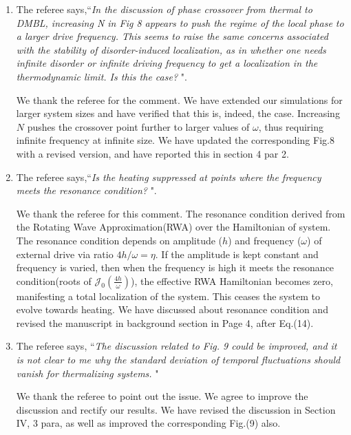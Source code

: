 \documentclass[aps,prb,reprint,showpacs,floatfix,superscriptaddress, onecolumn, nofootinbib, 9pt]{revtex4-2}
\newcommand{\response}[1]{{\color{blue}#1}} %
\begin{document}
\begin{enumerate}
		\item The referee says,``\textit{In the discussion of phase crossover from thermal to DMBL, increasing N in Fig 8 appears to push the regime of the local phase to a larger drive frequency. This seems to raise the same concerns associated with the stability of disorder-induced localization, as in whether one needs infinite disorder or infinite driving frequency to
			get a localization in the thermodynamic limit. Is this the case? }".
		
		\response{    	
			We thank the referee for the comment. We have extended our simulations for larger system sizes and have verified that this is, indeed, the case. Increasing $N$ pushes the crossover point further to larger values of $\omega$, thus requiring infinite frequency at infinite size. We have updated the corresponding Fig.8 with a revised version, and have reported this in section 4 par 2.
		}
		\item The referee says,``\textit{Is the heating suppressed at points where the frequency meets the resonance condition? }".
		
		\response{
			We thank the referee for this comment. The resonance condition derived from the Rotating Wave Approximation(RWA) over the Hamiltonian of system. The resonance condition depends on amplitude ($h$) and frequency ($\omega$) of external drive via ratio $4h/\omega=\eta$. If the amplitude is kept constant and frequency is varied, then when the frequency is high it meets the resonance condition(roots of  $\mathcal{J}_0\left(\frac{4h}{\omega}\right)$), the effective RWA Hamiltonian becomes zero, manifesting a total localization of the system. This ceases the system to evolve towards heating. We have discussed about resonance condition  and revised the manuscript in background section in Page 4, after Eq.(14). 
		}
		
		\item The referee says, ``\textit{The discussion related to Fig. 9 could be improved, and it is not clear to me why the standard deviation of temporal fluctuations should vanish for thermalizing systems. }"\\
		
		\response{ We thank the referee to point out the issue. We agree to improve the discussion and rectify our results. We have revised the discussion in Section IV, 3 para, as well as improved the corresponding Fig.(9) also.
			
}
\end{enumerate}
\end{document}

